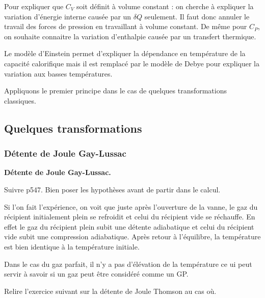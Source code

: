 \begin{remarque}
Pour expliquer que $C_V$ soit définit à volume constant : on cherche à expliquer la variation d'énergie interne causée par un $\delta Q$ seulement.
Il faut donc annuler le travail des forces de pression en travaillant à volume constant.
De même pour $C_P$, on souhaite connaitre la variation d'enthalpie causée par un transfert thermique.

\noindent
Le modèle d'Einstein permet d'expliquer la dépendance en température de la capacité calorifique mais il est remplacé par le modèle de Debye pour expliquer la variation aux basses températures.
\end{remarque}

\begin{transition}
Appliquons le premier principe dans le cas de quelques transformations classiques.
\end{transition}

\subsection{Quelques transformations}

\subsubsection{Détente de Joule Gay-Lussac}

\begin{slide}
\textbf{Détente de Joule Gay-Lussac.}
\end{slide}

Suivre \cite{Michel2017} p547.
Bien poser les hypothèses avant de partir dans le calcul.

\begin{remarque}
Si l'on fait l'expérience, on voit que juste après l'ouverture de la vanne, le gaz du récipient initialement plein se refroidit et celui du récipient vide se réchauffe.
En effet le gaz du récipient plein subit une détente adiabatique et celui du récipient vide subit une compression adiabatique.
Après retour à l'équilibre, la température est bien identique à la température initiale.
\end{remarque}

Dans le cas du gaz parfait, il n'y a pas d'élévation de la température ce ui peut servir à savoir si un gaz peut être considéré comme un GP.

\begin{remarque}
Relire l'exercice suivant sur la détente de Joule Thomson au cas où.
\end{remarque}

